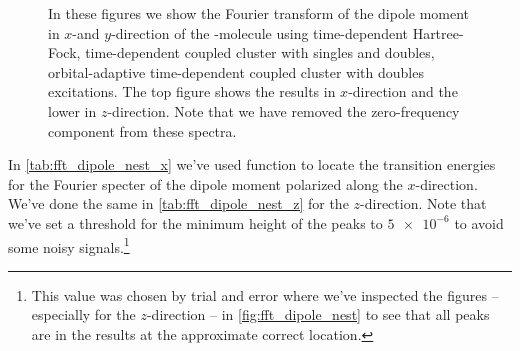\begin{figure}
            \caption{In these figures we show the Fourier transform of the
            dipole moment in $x$-and $y$-direction of the -molecule
            using time-dependent Hartree-Fock, time-dependent coupled cluster
            with singles and doubles, orbital-adaptive time-dependent coupled
            cluster with doubles excitations.
            The top figure shows the results in $x$-direction and the lower
            in $z$-direction.
            Note that we have removed the zero-frequency component from
            these spectra.}
            \label{fig:fft_dipole_nest}
        \end{figure}
        In \autoref{tab:fft_dipole_nest_x} we've used function
         \cite{scipy} to locate the transition
        energies for the Fourier specter of the dipole moment polarized along
        the $x$-direction.
        We've done the same in \autoref{tab:fft_dipole_nest_z} for the
        $z$-direction.
        Note that we've set a threshold for the minimum height of the peaks to
        $\num{5e-6}$ to avoid some noisy signals.\footnote{%
            This value was chosen by trial and error where we've inspected the
            figures --especially for the $z$-direction -- in
            \autoref{fig:fft_dipole_nest} to see that all peaks are in the
            results at the approximate correct location.
        }

